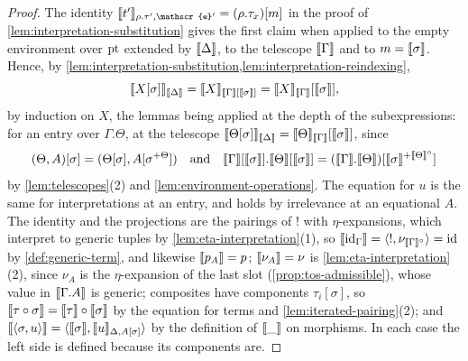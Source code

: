 \begin{proof}
    The identity $\sem{t'}_{\rho.\tau', \mathscr{e}'} = (\rho.\tau_x)[m]$ in the proof of \cref{lem:interpretation-substitution} gives the first claim when applied to the empty environment over $\mathrm{pt}$ extended by $\llbracket\Delta\rrbracket$, to the telescope $\llbracket\Gamma\rrbracket$ and to $m = \llbracket\sigma\rrbracket$. Hence, by \cref{lem:interpretation-substitution,lem:interpretation-reindexing},
    \[
        \llbracket X[\sigma]\rrbracket_{\llbracket\Delta\rrbracket} = \llbracket X\rrbracket_{\llbracket\Gamma\rrbracket[\llbracket\sigma\rrbracket]} = \llbracket X\rrbracket_{\llbracket\Gamma\rrbracket}[\llbracket\sigma\rrbracket],
    \]
    by induction on $X$, the lemmas being applied at the depth of the subexpressions: for an entry over $\Gamma.\Theta$, at the telescope $\llbracket\Theta[\sigma]\rrbracket_{\llbracket\Delta\rrbracket} = \llbracket\Theta\rrbracket_{\llbracket\Gamma\rrbracket}[\llbracket\sigma\rrbracket]$, since
    \[
        (\Theta, A)[\sigma] = (\Theta[\sigma], A[\sigma^{+\Theta}]) \quad \text{and} \quad \llbracket\Gamma\rrbracket[\llbracket\sigma\rrbracket].\llbracket\Theta\rrbracket[\llbracket\sigma\rrbracket] = (\llbracket\Gamma\rrbracket.\llbracket\Theta\rrbracket)[\llbracket\sigma\rrbracket^{+\llbracket\Theta\rrbracket^{\circ}}]
    \]
    by \cref{lem:telescopes}(2) and \cref{lem:environment-operations}. The equation for $u$ is the same for interpretations at an entry, and holds by irrelevance at an equational $A$. The identity and the projections are the pairings of $!$ with $\eta$-expansions, which interpret to generic tuples by \cref{lem:eta-interpretation}(1), so $\llbracket\mathrm{id}_\Gamma\rrbracket = \langle !, \nu_{\llbracket\Gamma\rrbracket^{\circ}} \rangle = \mathrm{id}$ by \cref{def:generic-term}, and likewise $\llbracket p_A\rrbracket = p$; $\llbracket\nu_A\rrbracket = \nu$ is \cref{lem:eta-interpretation}(2), since $\nu_A$ is the $\eta$-expansion of the last slot (\cref{prop:tos-admissible}), whose value in $\llbracket\Gamma.A\rrbracket$ is generic; composites have components $\tau_i[\sigma]$, so $\llbracket\tau \circ \sigma\rrbracket = \llbracket\tau\rrbracket \circ \llbracket\sigma\rrbracket$ by the equation for terms and \cref{lem:iterated-pairing}(2); and $\llbracket\langle \sigma, u \rangle\rrbracket = \langle \llbracket\sigma\rrbracket, \llbracket u\rrbracket_{\Delta, A[\sigma]} \rangle$ by the definition of $\llbracket\_\rrbracket$ on morphisms. In each case the left side is defined because its components are.
\end{proof}

